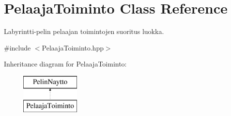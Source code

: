 \hypertarget{class_pelaaja_toiminto}{}\section{Pelaaja\+Toiminto Class Reference}
\label{class_pelaaja_toiminto}


Labyrintti-\/pelin pelaajan toimintojen suoritus luokka.  




{\ttfamily \#include $<$Pelaaja\+Toiminto.\+hpp$>$}

Inheritance diagram for Pelaaja\+Toiminto\+:\begin{figure}[H]
\begin{center}
\leavevmode
\includegraphics[height=2.000000cm]{class_pelaaja_toiminto}
\end{center}
\end{figure}
